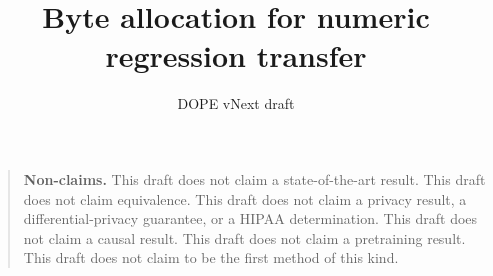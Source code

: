 \documentclass{article}
\title{Byte allocation for numeric regression transfer}
\author{DOPE vNext draft}
\date{}
\newenvironment{vnextnonclaims}{\begin{quote}\noindent\textbf{Non-claims.} }{\end{quote}}
\begin{document}
\maketitle
\begin{abstract}

\end{abstract}
\begin{vnextnonclaims}
This draft does not claim a state-of-the-art result.
This draft does not claim equivalence.
This draft does not claim a privacy result, a differential-privacy guarantee, or a HIPAA determination.
This draft does not claim a causal result.
This draft does not claim a pretraining result.
This draft does not claim to be the first method of this kind.
\end{vnextnonclaims}









\end{document}
